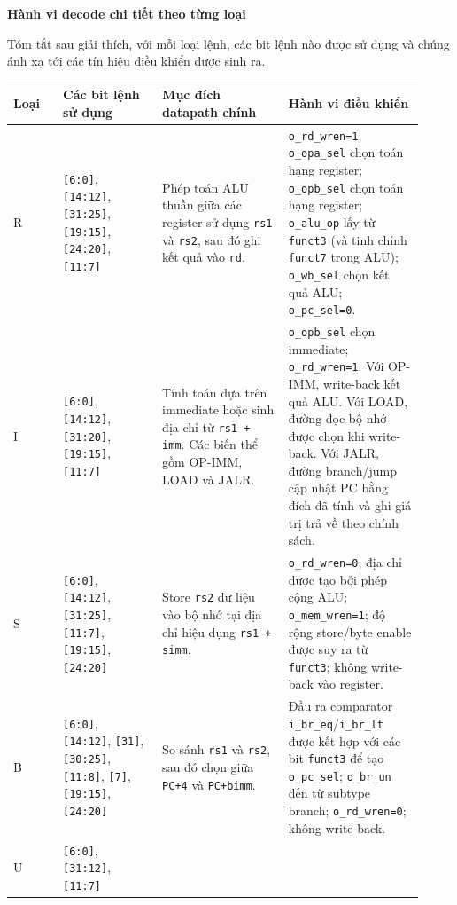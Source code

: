 \documentclass[10pt,a4paper]{article}
\begin{document}
\textbf{Hành vi decode chi tiết theo từng loại}

Tóm tắt sau giải thích, với mỗi loại lệnh, các bit lệnh nào
được sử dụng và chúng ánh xạ tới các tín hiệu điều khiển được sinh ra.

\begin{center}
\small
\begin{tabular}{@{}p{0.11\linewidth}p{0.22\linewidth}p{0.29\linewidth}p{0.30\linewidth}@{}}
\toprule
\textbf{Loại} & \textbf{Các bit lệnh sử dụng} & \textbf{Mục đích datapath chính} & \textbf{Hành vi điều khiển} \\
\midrule
R & \texttt{[6:0]}, \texttt{[14:12]}, \texttt{[31:25]}, \texttt{[19:15]}, \texttt{[24:20]}, \texttt{[11:7]} &
Phép toán ALU thuần giữa các register sử dụng \texttt{rs1} và \texttt{rs2}, sau đó ghi kết quả vào \texttt{rd}. &
\texttt{o\_rd\_wren=1}; \texttt{o\_opa\_sel} chọn toán hạng register; \texttt{o\_opb\_sel} chọn toán hạng register; \texttt{o\_alu\_op} lấy từ \texttt{funct3} (và tinh chỉnh \texttt{funct7} trong ALU); \texttt{o\_wb\_sel} chọn kết quả ALU; \texttt{o\_pc\_sel=0}. \\
\addlinespace
I & \texttt{[6:0]}, \texttt{[14:12]}, \texttt{[31:20]}, \texttt{[19:15]}, \texttt{[11:7]} &
Tính toán dựa trên immediate hoặc sinh địa chỉ từ \texttt{rs1 + imm}. Các biến thể gồm OP-IMM, LOAD và JALR. &
\texttt{o\_opb\_sel} chọn immediate; \texttt{o\_rd\_wren=1}. Với OP-IMM, write-back kết quả ALU. Với LOAD, đường đọc bộ nhớ được chọn khi write-back. Với JALR, đường branch/jump cập nhật PC bằng đích đã tính và ghi giá trị trả về theo chính sách. \\
\addlinespace
S & \texttt{[6:0]}, \texttt{[14:12]}, \texttt{[31:25]}, \texttt{[11:7]}, \texttt{[19:15]}, \texttt{[24:20]} &
Store \texttt{rs2} dữ liệu vào bộ nhớ tại địa chỉ hiệu dụng \texttt{rs1 + simm}. &
\texttt{o\_rd\_wren=0}; địa chỉ được tạo bởi phép cộng ALU; \texttt{o\_mem\_wren=1}; độ rộng store/byte enable được suy ra từ \texttt{funct3}; không write-back vào register. \\
\addlinespace
B & \texttt{[6:0]}, \texttt{[14:12]}, \texttt{[31]}, \texttt{[30:25]}, \texttt{[11:8]}, \texttt{[7]}, \texttt{[19:15]}, \texttt{[24:20]} &
So sánh \texttt{rs1} và \texttt{rs2}, sau đó chọn giữa \texttt{PC+4} và \texttt{PC+bimm}. &
Đầu ra comparator \texttt{i\_br\_eq}/\texttt{i\_br\_lt} được kết hợp với các bit \texttt{funct3} để tạo \texttt{o\_pc\_sel}; \texttt{o\_br\_un} đến từ subtype branch; \texttt{o\_rd\_wren=0}; không write-back. \\
\addlinespace
U & \texttt{[6:0]}, \texttt{[31:12]}, \texttt{[11:7]} &

\end{tabular}
\end{center}
\end{document}
